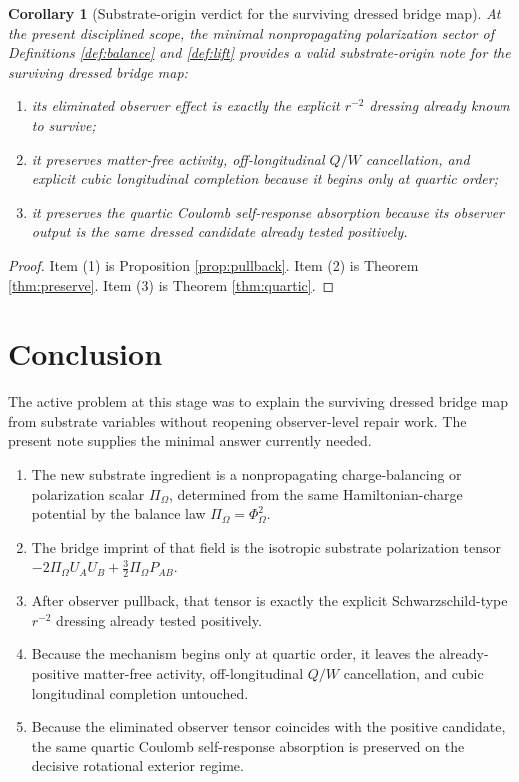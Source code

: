 \documentclass[11pt]{article}
\newcommand{\ProjSub}{P}
\newcommand{\FlowPot}{\Phi_\Omega}
\newcommand{\BalanceField}{\Pi_\Omega}
\newtheorem{corollary}{Corollary}
\begin{document}
\begin{corollary}[Substrate-origin verdict for the surviving dressed bridge map]
\label{cor:verdict}
At the present disciplined scope, the minimal nonpropagating polarization sector of Definitions \ref{def:balance} and \ref{def:lift} provides a valid substrate-origin note for the surviving dressed bridge map:
\begin{enumerate}
    \item its eliminated observer effect is exactly the explicit \(r^{-2}\) dressing already known to survive;
    \item it preserves matter-free activity, off-longitudinal \(Q/W\) cancellation, and explicit cubic longitudinal completion because it begins only at quartic order;
    \item it preserves the quartic Coulomb self-response absorption because its observer output is the same dressed candidate already tested positively.
\end{enumerate}
\end{corollary}

\begin{proof}
Item (1) is Proposition \ref{prop:pullback}. Item (2) is Theorem \ref{thm:preserve}. Item (3) is Theorem \ref{thm:quartic}.
\end{proof}

\section{Conclusion}

The active problem at this stage was to explain the surviving dressed bridge map from substrate variables without reopening observer-level repair work. The present note supplies the minimal answer currently needed.

\begin{enumerate}
    \item The new substrate ingredient is a nonpropagating charge-balancing or polarization scalar \(\BalanceField\), determined from the same Hamiltonian-charge potential by the balance law \(\BalanceField=\FlowPot^2\).
    \item The bridge imprint of that field is the isotropic substrate polarization tensor \(-2\BalanceField U_AU_B+\tfrac32\BalanceField\ProjSub_{AB}\).
    \item After observer pullback, that tensor is exactly the explicit Schwarzschild-type \(r^{-2}\) dressing already tested positively.
    \item Because the mechanism begins only at quartic order, it leaves the already-positive matter-free activity, off-longitudinal \(Q/W\) cancellation, and cubic longitudinal completion untouched.
    \item Because the eliminated observer tensor coincides with the positive candidate, the same quartic Coulomb self-response absorption is preserved on the decisive rotational exterior regime.
\end{enumerate}
\end{document}
